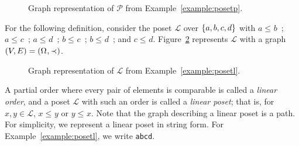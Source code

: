 \documentclass[12pt]{llncs}
\DeclarePairedDelimiter{\set}{\{}{\}}
\DeclarePairedDelimiter{\tuple}{(}{)}
\let\oldleq\leq
\renewcommand{\leq}[1][]{\oldleq_{#1}}
\newcommand{\poset}[1]{\mathcal{#1}}
\newcommand{\uni}[1][]{\Omega_{#1}}
\newcommand{\lin}[1]{\texttt{#1}}
\newcommand{\incomp}{\parallel}
\newcommand{\covered}{\prec}
\begin{document}
\begin{figure}[H]
    \centering
    \caption{Graph representation of $\poset{P}$ from Example~\ref{example:posetp}.}
    \label{figure:posetp}
\end{figure}


\begin{example}
    For the following definition, consider the poset $\poset{L}$ over $\set{a,b,c,d}$ with $a \leq b$\ ; $a \leq c$\ ; $a \leq d$\ ; $b \leq c$\ ; $b \leq d$\ ; and $c \leq d$. Figure~\ref{figure:posetl} represents $\poset{L}$ with a graph $\tuple{V,E} = \tuple{\uni,\covered}$.
    \label{example:posetl}
\end{example}

\begin{figure}[H]
    \centering
    \caption{Graph representation of $\poset{L}$ from Example~\ref{example:posetl}.}
    \label{figure:posetl}
\end{figure}

A partial order where every pair of elements is comparable is called a \emph{linear order}, and a poset $\poset{L}$ with such an order is called a \emph{linear poset}; that is, for $x, y \!\in\! \poset{L}$, $x \leq y$ or $y \leq x$. Note that the graph describing a linear poset is a path. For simplicity, we represent a linear poset in string form. For Example~\ref{example:posetl}, we write \lin{abcd}.
\end{document}
